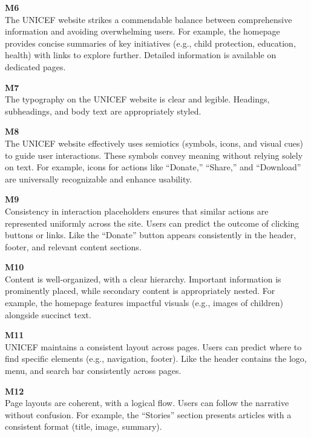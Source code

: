 \documentclass{article}
\begin{document}
\begin{description}
    \item {\textbf{M6} \color{unicefGray}{Content (Information overload)}}\\
    The UNICEF website strikes a commendable balance between comprehensive information and avoiding overwhelming users. For example, the homepage provides concise summaries of key initiatives (e.g., child protection, education, health) with links to explore further. Detailed information is available on dedicated pages.
    \item {\textbf{M7} \color{unicefGray}{Text layout}}\\
    The typography on the UNICEF website is clear and legible. Headings, subheadings, and body text are appropriately styled.
    \item {\textbf{M8} \color{unicefGray}{Interaction placeholders (Semiotics)}}\\
    The UNICEF website effectively uses semiotics (symbols, icons, and visual cues) to guide user interactions. These symbols convey meaning without relying solely on text. For example, icons for actions like “Donate,” “Share,” and “Download” are universally recognizable and enhance usability.
    \item {\textbf{M9} \color{unicefGray}{Interaction placeholders (Consistency)}}\\
    Consistency in interaction placeholders ensures that similar actions are represented uniformly across the site. Users can predict the outcome of clicking buttons or links. Like the “Donate” button appears consistently in the header, footer, and relevant content sections.
    \item {\textbf{M10} \color{unicefGray}{Spatial allocation of content}}\\
    Content is well-organized, with a clear hierarchy. Important information is prominently placed, while secondary content is appropriately nested. For example, the homepage features impactful visuals (e.g., images of children) alongside succinct text.
    \item {\textbf{M11} \color{unicefGray}{Consistency of page structure}}\\
    UNICEF maintains a consistent layout across pages. Users can predict where to find specific elements (e.g., navigation, footer). Like the header contains the logo, menu, and search bar consistently across pages.
    \item {\textbf{M12} \color{unicefGray}{Coherence in page layouts}}\\
    Page layouts are coherent, with a logical flow. Users can follow the narrative without confusion. For example, the “Stories” section presents articles with a consistent format (title, image, summary).
\end{description}
\end{document}
